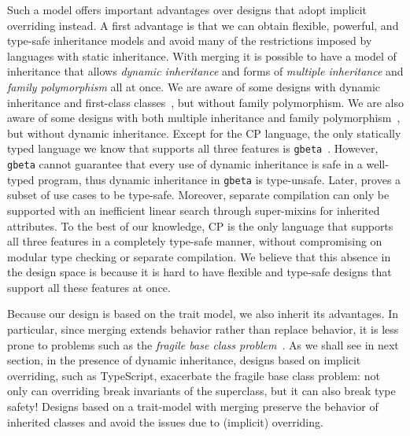 Such a model offers important advantages over designs that adopt implicit
overriding instead. A first advantage is that we can obtain flexible, powerful,
and type-safe inheritance models and avoid many of the restrictions imposed by
languages with static inheritance.  With merging it is possible to have a model
of inheritance that allows \emph{dynamic inheritance} and forms of
\emph{multiple inheritance} and \emph{family polymorphism} all at once. We are
aware of some designs with dynamic inheritance and first-class
classes~\citep{takikawa2012gradual,lee2015theory}, but without family
polymorphism.  We are also aware of some designs with both multiple inheritance
and family polymorphism~\citep{nystrom2006j,aracic2006overview,clarke2007tribe},
but without dynamic inheritance. Except for the CP language, the only statically
typed language we know that supports all three features is
\texttt{gbeta}~\citep{ernst2000gbeta}. However, \texttt{gbeta} cannot guarantee
that every use of dynamic inheritance is safe in a well-typed program,
thus dynamic inheritance in \texttt{gbeta} is type-unsafe. Later,
\citet{ernst2002safe} proves a subset of use cases to be type-safe. Moreover,
separate compilation can only be supported with an inefficient linear search
through super-mixins for inherited attributes. To the best of our knowledge, CP
is the only language that supports all three features in a completely type-safe
manner, without compromising on modular type checking or separate compilation.
We believe that this absence in the design space is because it is hard to have
flexible and type-safe designs that support all these features at once.

Because our design is based on the trait model, we also inherit its advantages.
In particular, since merging extends behavior rather than replace behavior, it
is less prone to problems such as the \emph{fragile base class
problem}~\citep{mikhajlov1998study}. As we shall see in next section, in the
presence of dynamic inheritance, designs based on implicit overriding, such as
TypeScript, exacerbate the fragile base class problem: not only can overriding
break invariants of the superclass, but it can also break type safety! Designs
based on a trait-model with merging preserve the behavior of inherited classes
and avoid the issues due to (implicit) overriding.
